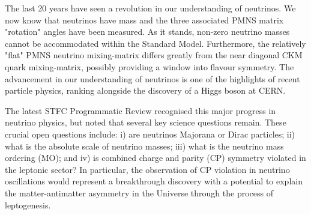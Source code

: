 The last 20 years have seen a revolution in our understanding of neutrinos. We now know that neutrinos have mass and the three associated PMNS matrix "rotation" angles have been measured. As it stands, non-zero neutrino masses cannot be accommodated within the Standard Model. Furthermore, the relatively "flat" PMNS neutrino mixing-matrix differs greatly from the near diagonal CKM quark mixing-matrix, possibly providing a window into flavour symmetry. The advancement in our understanding of neutrinos is one of the highlights of recent particle physics, ranking alongside the discovery of a Higgs boson at CERN. 

The latest STFC Programmatic Review recognised this major progress in neutrino physics, but noted that several key science questions remain. 
These crucial open questions include: i) are neutrinos Majorana or Dirac particles; ii) what is the absolute scale of neutrino masses; iii) what is the neutrino mass ordering (MO); and iv) is combined charge and parity (CP) symmetry violated in the leptonic sector? In particular, the observation of CP violation in neutrino oscillations would represent a breakthrough discovery with a potential to explain the matter-antimatter asymmetry in the Universe through the process of leptogenesis. 

